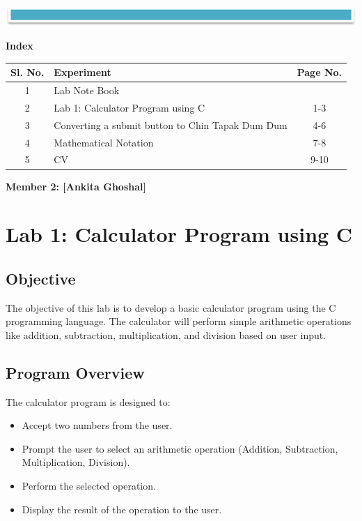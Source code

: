 \documentclass{article}
\begin{document}
\begin{center}
    \includegraphics[width=1\textwidth]{Line.png}
\end{center}
\newpage

\begin{center}
    \Huge\textbf{Index}
\end{center}

\vspace{1cm}

\begin{tabular}{|c|p{10cm}|c|}
    \hline
    \textbf{Sl. No.} & \textbf{Experiment} & \textbf{Page No.} \\
    \hline
    1 & Lab Note Book & \\
    \hline
    2 & Lab 1: Calculator Program using C & 1-3\\
    \hline
    3 & Converting a submit button to Chin Tapak Dum Dum & 4-6 \\
    \hline
    4 & Mathematical Notation & 7-8\\
    \hline
    5 & CV & 9-10 \\
    \hline
\end{tabular}


\newpage
\begin{center}
    \textbf{\LARGE{{Member 2: [Ankita Ghoshal]}}}
\end{center}
\section{Lab 1: Calculator Program using C}
\subsection{Objective}
The objective of this lab is to develop a basic calculator program using the C programming language. The calculator will perform simple arithmetic operations like addition, subtraction, multiplication, and division based on user input.

\subsection{Program Overview}
The calculator program is designed to:
\begin{itemize}
    \item Accept two numbers from the user.
    \item Prompt the user to select an arithmetic operation (Addition, Subtraction, Multiplication, Division).
    \item Perform the selected operation.
    \item Display the result of the operation to the user.
\end{itemize}
\end{document}
